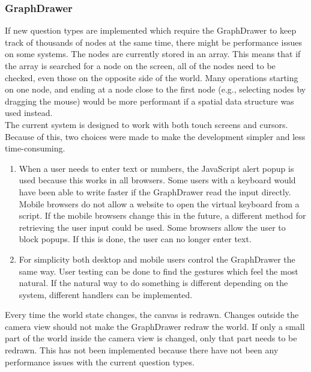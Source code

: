 \subsubsection{GraphDrawer}
If new question types are implemented which require the GraphDrawer to keep track of thousands of nodes at the same time, there might be performance issues on some systems. The nodes are currently stored in an array. This means that if the array is searched for a node on the screen, all of the nodes need to be checked, even those on the opposite side of the world. Many operations starting on one node, and ending at a node close to the first node (e.g., selecting nodes by dragging the mouse) would be more performant if a spatial data structure\cite{SpatialDatastructure} was used instead.
\\[11pt]
The current system is designed to work with both touch screens and cursors. Because of this, two choices were made to make the development simpler and less time-consuming.
\begin{enumerate}
    \item When a user needs to enter text or numbers, the JavaScript alert popup is used because this works in all browsers. Some users with a keyboard would have been able to write faster if the GraphDrawer read the input directly. Mobile browsers do not allow a website to open the virtual keyboard from a script. If the mobile browsers change this in the future, a different method for retrieving the user input could be used. Some browsers allow the user to block popups. If this is done, the user can no longer enter text.
    \item For simplicity both desktop and mobile users control the GraphDrawer the same way. User testing can be done to find the gestures which feel the most natural. If the natural way to do something is different depending on the system, different handlers can be implemented.
\end{enumerate}
Every time the world state changes, the canvas is redrawn. Changes outside the camera view should not make the GraphDrawer redraw the world. If only a small part of the world inside the camera view is changed, only that part needs to be redrawn. This has not been implemented because there have not been any performance issues with the current question types.